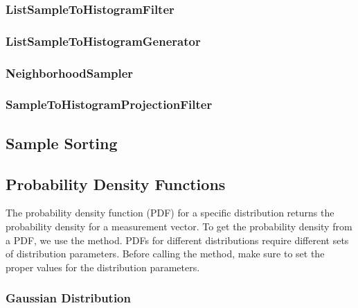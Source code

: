 \subsubsection{ListSampleToHistogramFilter}
\label{sec:ListSampleToHistogramFilter}



\subsubsection{ListSampleToHistogramGenerator}
\label{sec:ListSampleToHistogramGenerator}



\subsubsection{NeighborhoodSampler}
\label{sec:NeighborhoodSampler}



\subsubsection{SampleToHistogramProjectionFilter}
\label{sec:SampleToHistogramProjectionFilter}



\subsection{Sample Sorting}
\label{sec:SampleSorting}



\subsection{Probability Density Functions}
\label{sec:ProbabilityDensityFunctions}

The probability density function (PDF) for a specific distribution returns
the probability density for a measurement vector. To get the probability
density from a PDF, we use the  method. PDFs for
different distributions require different sets of distribution
parameters. Before calling the  method, make sure to set the
proper values for the distribution parameters.

\subsubsection{Gaussian Distribution}
\label{sec:GaussianDensityFunction}

